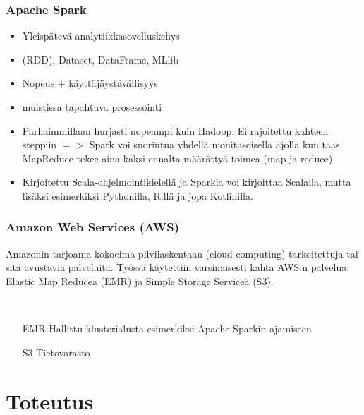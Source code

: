\documentclass{beamer}
\begin{document}

\begin{frame}
\frametitle{Apache Spark}

\begin{itemize}
	\item Yleispätevä analytiikkasovelluskehys
	\item (RDD), Dataset, DataFrame, MLlib
	\item Nopeus + käyttäjäystävällisyys
	\item muistissa tapahtuva prosessointi
	\item Parhaimmillaan hurjasti nopeampi kuin Hadoop: Ei rajoitettu kahteen steppiin $=>$ Spark voi suoriutua yhdellä monitasoisella ajolla kun taas MapReduce tekee aina kaksi ennalta määrättyä toimea (map ja reduce)
	\item Kirjoitettu Scala-ohjelmointikielellä ja Sparkia voi kirjoittaa Scalalla, mutta lisäksi esimerkiksi Pythonilla, R:llä ja jopa Kotlinilla.
\end{itemize}

\end{frame}


\begin{frame}
\frametitle{Amazon Web Services (AWS)}

Amazonin tarjoama kokoelma pilvilaskentaan (cloud computing) tarkoitettuja tai sitä avustavia palveluita.
Työssä käytettiin varsinaisesti kahta AWS:n palvelua: Elastic Map Reducea (EMR) ja Simple Storage Serviceä (S3).

~

\begin{itemize}
	\item [EMR] Hallittu klusterialusta esimerkiksi Apache Sparkin ajamiseen
	\item [S3] Tietovarasto
\end{itemize}

\end{frame}


\section{Toteutus}
\end{document}
